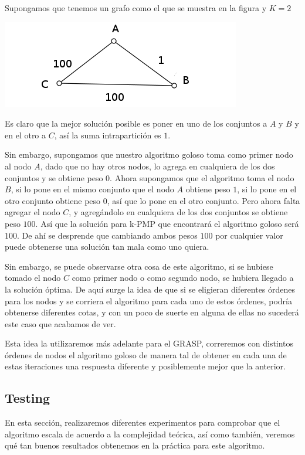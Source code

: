Supongamos que tenemos un grafo como el que se muestra en la figura y $K = 2$

\includegraphics[scale=0.5]{Ej3/grafo.png}

Es claro que la mejor solución posible es poner en uno de los conjuntos a $A$ y $B$ y en el otro a $C$, así la suma intrapartición es $1$.

Sin embargo, supongamos que nuestro algoritmo goloso toma como primer nodo al nodo $A$, dado que no hay otros nodos, lo agrega en cualquiera de los dos conjuntos y se obtiene peso $0$. Ahora supongamos que el algoritmo toma el nodo $B$, si lo pone en el mismo conjunto que el nodo $A$ obtiene peso $1$, si lo pone en el otro conjunto obtiene peso $0$, así que lo pone en el otro conjunto. Pero ahora falta agregar el nodo $C$, y agregándolo en cualquiera de los dos conjuntos se obtiene peso $100$. Así que la solución para k-PMP que encontrará el algoritmo goloso será $100$.
De ahí se desprende que cambiando ambos pesos $100$ por cualquier valor puede obtenerse una solución tan mala como uno quiera.

Sin embargo, se puede observarse otra cosa de este algoritmo, si se hubiese tomado el nodo $C$ como primer nodo o como segundo nodo, se hubiera llegado a la solución óptima. De aquí surge la idea de que si se eligieran diferentes órdenes para los nodos y se corriera el algoritmo para cada uno de estos órdenes, podría obtenerse diferentes cotas, y con un poco de suerte en alguna de ellas no sucederá este caso que acabamos de ver.

Esta idea la utilizaremos más adelante para el GRASP, correremos con distintos órdenes de nodos el algoritmo goloso de manera tal de obtener en cada una de estas iteraciones una respuesta diferente y posiblemente mejor que la anterior.

\subsection{Testing}

En esta sección, realizaremos diferentes experimentos para comprobar que el algoritmo escala de acuerdo a la complejidad teórica, así como también, veremos qué tan buenos resultados obtenemos en la práctica para este algoritmo.

